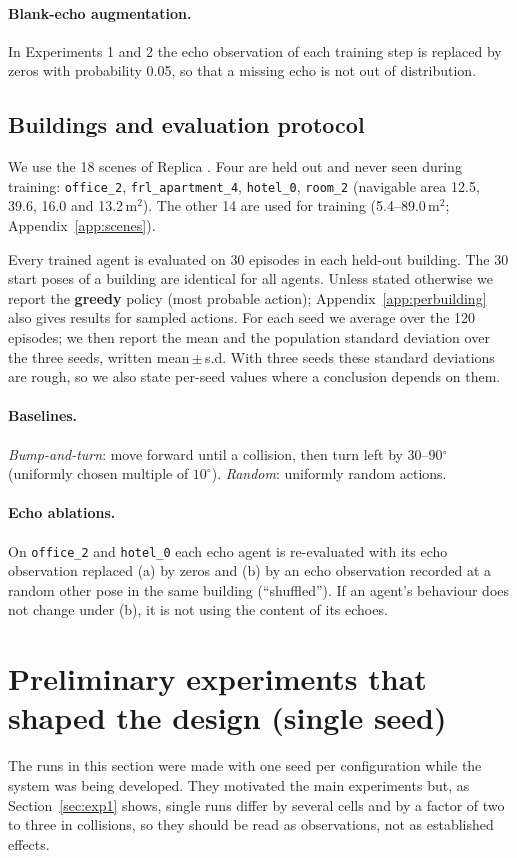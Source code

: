 \documentclass[10pt]{article}
\newcommand{\pmsd}[2]{#1\,{\scriptsize$\pm$\,#2}}
\begin{document}
\paragraph{Blank-echo augmentation.} In Experiments 1 and 2 the echo observation of each training step is replaced by zeros with probability 0.05, so that a missing echo is not out of distribution.

\subsection{Buildings and evaluation protocol}
We use the 18 scenes of Replica \citep{straub2019replica}. Four are held out and never seen during training: \texttt{office\_2}, \texttt{frl\_apartment\_4}, \texttt{hotel\_0}, \texttt{room\_2} (navigable area 12.5, 39.6, 16.0 and 13.2\,m$^2$). The other 14 are used for training (5.4--89.0\,m$^2$; Appendix~\ref{app:scenes}).

Every trained agent is evaluated on 30 episodes in each held-out building. The 30 start poses of a building are identical for all agents. Unless stated otherwise we report the \textbf{greedy} policy (most probable action); Appendix~\ref{app:perbuilding} also gives results for sampled actions. For each seed we average over the 120 episodes; we then report the mean and the population standard deviation over the three seeds, written \pmsd{mean}{s.d.} With three seeds these standard deviations are rough, so we also state per-seed values where a conclusion depends on them.

\paragraph{Baselines.} \emph{Bump-and-turn}: move forward until a collision, then turn left by 30--90$^\circ$ (uniformly chosen multiple of $10^\circ$). \emph{Random}: uniformly random actions.
\paragraph{Echo ablations.} On \texttt{office\_2} and \texttt{hotel\_0} each echo agent is re-evaluated with its echo observation replaced (a) by zeros and (b) by an echo observation recorded at a random other pose in the same building (``shuffled''). If an agent's behaviour does not change under (b), it is not using the content of its echoes.

\section{Preliminary experiments that shaped the design (single seed)}
\label{sec:prelim}
The runs in this section were made with one seed per configuration while the system was being developed. They motivated the main experiments but, as Section~\ref{sec:exp1} shows, single runs differ by several cells and by a factor of two to three in collisions, so they should be read as observations, not as established effects.
\end{document}
